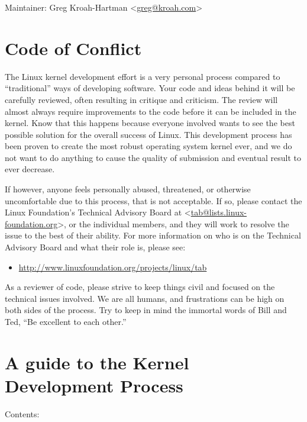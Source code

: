 \documentclass[a4paper,8pt,english]{sphinxmanual}
\begin{document}
Maintainer: Greg Kroah-Hartman \textless{}\href{mailto:greg@kroah.com}{greg@kroah.com}\textgreater{}


\chapter{Code of Conflict}
\label{process/code-of-conflict:code-of-conflict}\label{process/code-of-conflict::doc}
The Linux kernel development effort is a very personal process compared
to ``traditional'' ways of developing software.  Your code and ideas
behind it will be carefully reviewed, often resulting in critique and
criticism.  The review will almost always require improvements to the
code before it can be included in the kernel.  Know that this happens
because everyone involved wants to see the best possible solution for
the overall success of Linux.  This development process has been proven
to create the most robust operating system kernel ever, and we do not
want to do anything to cause the quality of submission and eventual
result to ever decrease.

If however, anyone feels personally abused, threatened, or otherwise
uncomfortable due to this process, that is not acceptable.  If so,
please contact the Linux Foundation's Technical Advisory Board at
\textless{}\href{mailto:tab@lists.linux-foundation.org}{tab@lists.linux-foundation.org}\textgreater{}, or the individual members, and they
will work to resolve the issue to the best of their ability.  For more
information on who is on the Technical Advisory Board and what their
role is, please see:
\begin{itemize}
\item {} 
\href{http://www.linuxfoundation.org/projects/linux/tab}{http://www.linuxfoundation.org/projects/linux/tab}

\end{itemize}

As a reviewer of code, please strive to keep things civil and focused on
the technical issues involved.  We are all humans, and frustrations can
be high on both sides of the process.  Try to keep in mind the immortal
words of Bill and Ted, ``Be excellent to each other.''


\chapter{A guide to the Kernel Development Process}
\label{process/development-process:development-process-main}\label{process/development-process::doc}\label{process/development-process:a-guide-to-the-kernel-development-process}
Contents:
\end{document}
